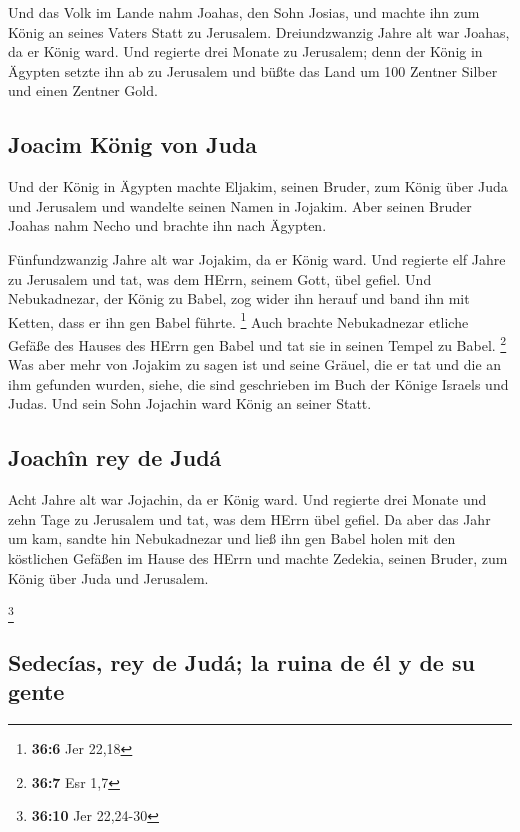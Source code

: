  Und das Volk im Lande nahm Joahas, den Sohn Josias, und
machte ihn zum König an seines Vaters Statt zu Jerusalem. 
Dreiundzwanzig Jahre alt war Joahas, da er König ward. Und regierte drei
Monate zu Jerusalem;  denn der König in Ägypten setzte ihn
ab zu Jerusalem und büßte das Land um 100 Zentner Silber und einen
Zentner Gold.

\hypertarget{joacim-kuxf6nig-von-juda}{%
\subsection{Joacim König von Juda}\label{joacim-kuxf6nig-von-juda}}

 Und der König in Ägypten machte Eljakim, seinen Bruder,
zum König über Juda und Jerusalem und wandelte seinen Namen in Jojakim.
Aber seinen Bruder Joahas nahm Necho und brachte ihn nach Ägypten.

 Fünfundzwanzig Jahre alt war Jojakim, da er König ward.
Und regierte elf Jahre zu Jerusalem und tat, was dem HErrn, seinem Gott,
übel gefiel.  Und Nebukadnezar, der König zu Babel, zog
wider ihn herauf und band ihn mit Ketten, dass er ihn gen Babel führte.
\footnote{\textbf{36:6} Jer 22,18}  Auch brachte
Nebukadnezar etliche Gefäße des Hauses des HErrn gen Babel und tat sie
in seinen Tempel zu Babel. \footnote{\textbf{36:7} Esr 1,7}
 Was aber mehr von Jojakim zu sagen ist und seine Gräuel,
die er tat und die an ihm gefunden wurden, siehe, die sind geschrieben
im Buch der Könige Israels und Judas. Und sein Sohn Jojachin ward König
an seiner Statt.

\hypertarget{joachuxeen-rey-de-juduxe1}{%
\subsection{Joachîn rey de Judá}\label{joachuxeen-rey-de-juduxe1}}

 Acht Jahre alt war Jojachin, da er König ward. Und
regierte drei Monate und zehn Tage zu Jerusalem und tat, was dem HErrn
übel gefiel.  Da aber das Jahr um kam, sandte hin
Nebukadnezar und ließ ihn gen Babel holen mit den köstlichen Gefäßen im
Hause des HErrn und machte Zedekia, seinen Bruder, zum König über Juda
und Jerusalem.

\footnote{\textbf{36:10} Jer 22,24-30}

\hypertarget{sedecuxedas-rey-de-juduxe1-la-ruina-de-uxe9l-y-de-su-gente}{%
\subsection{Sedecías, rey de Judá; la ruina de él y de su
gente}\label{sedecuxedas-rey-de-juduxe1-la-ruina-de-uxe9l-y-de-su-gente}}

